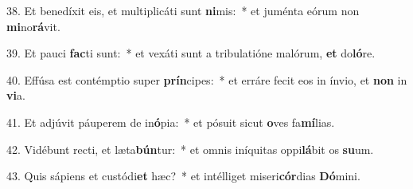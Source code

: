 38. Et benedíxit eis, et multiplicáti sunt \textbf{ni}mis:~*  et juménta eórum non \textbf{mi}no\textbf{rá}vit.\

39. Et pauci \textbf{fac}ti sunt:~*  et vexáti sunt a tribulatióne malórum, \textbf{et} do\textbf{ló}re.\

40. Effúsa est contémptio super \textbf{prín}cipes:~*  et erráre fecit eos in ínvio, et \textbf{non} in \textbf{vi}a.\

41. Et adjúvit páuperem de in\textbf{ó}pia:~*  et pósuit sicut \textbf{o}ves fa\textbf{mí}lias.\

42. Vidébunt recti, et læta\textbf{bún}tur:~*  et omnis iníquitas oppi\textbf{lá}bit os \textbf{su}um.\

43. Quis sápiens et custódi\textbf{et} hæc?~*  et intélliget miseri\textbf{cór}dias \textbf{Dó}mini.\

